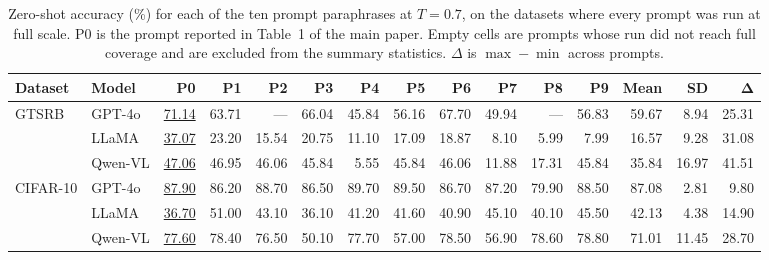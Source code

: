 \documentclass[10pt,twocolumn,letterpaper]{article}
\begin{document}
\begin{table}[t]
\centering
\caption{Zero-shot accuracy (\%) for each of the ten prompt paraphrases at $T{=}0.7$, on the datasets where every prompt was run at full scale. P0 is the prompt reported in Table~1 of the main paper. Empty cells are prompts whose run did not reach full coverage and are excluded from the summary statistics. $\Delta$ is $\max-\min$ across prompts.}
\label{tab:supp_prompt_sweep}
\footnotesize
\setlength{\tabcolsep}{4pt}
\begin{tabular}{@{}llrrrrrrrrrr@{\hspace{6pt}}rrr@{}}
\toprule
\textbf{Dataset} & \textbf{Model} & \textbf{P0} & \textbf{P1} & \textbf{P2} & \textbf{P3} & \textbf{P4} & \textbf{P5} & \textbf{P6} & \textbf{P7} & \textbf{P8} & \textbf{P9} & \textbf{Mean} & \textbf{SD} & $\boldsymbol{\Delta}$ \\
\midrule
GTSRB     & GPT-4o   & \underline{71.14} &            63.71 &              --- &            66.04 &            45.84 &            56.16 &            67.70 &            49.94 &              --- &            56.83 & 59.67 & 8.94 & 25.31 \\
          & LLaMA    & \underline{37.07} &            23.20 &            15.54 &            20.75 &            11.10 &            17.09 &            18.87 &             8.10 &             5.99 &             7.99 & 16.57 & 9.28 & 31.08 \\
          & Qwen-VL  & \underline{47.06} &            46.95 &            46.06 &            45.84 &             5.55 &            45.84 &            46.06 &            11.88 &            17.31 &            45.84 & 35.84 & 16.97 & 41.51 \\
\midrule
CIFAR-10  & GPT-4o   & \underline{87.90} &            86.20 &            88.70 &            86.50 &            89.70 &            89.50 &            86.70 &            87.20 &            79.90 &            88.50 & 87.08 & 2.81 & 9.80 \\
          & LLaMA    & \underline{36.70} &            51.00 &            43.10 &            36.10 &            41.20 &            41.60 &            40.90 &            45.10 &            40.10 &            45.50 & 42.13 & 4.38 & 14.90 \\
          & Qwen-VL  & \underline{77.60} &            78.40 &            76.50 &            50.10 &            77.70 &            57.00 &            78.50 &            56.90 &            78.60 &            78.80 & 71.01 & 11.45 & 28.70 \\
\bottomrule
\end{tabular}
\end{table}
\end{document}
